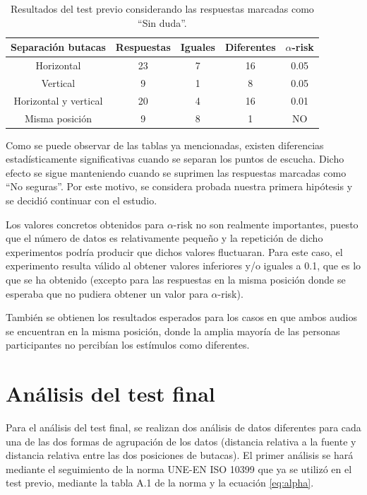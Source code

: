 \documentclass[11pt,a4paper,twoside]{book}
\begin{document}
		\begin{table}
			\begin{center}
			\begin{scriptsize}
			\begin{tabular}{| c | c | c | c || c |}
			    \hline
				\textbf{Separación butacas}&\textbf{Respuestas}&\textbf{Iguales}&\textbf{Diferentes}&\textbf{$\alpha$-risk}\\ \hline
                Horizontal&23&7&16&0.05\\ \hline
                Vertical&9&1&8&0.05\\ \hline
                Horizontal y vertical&20&4&16&0.01\\ \hline
                Misma posición&9&8&1&NO\\ \hline
			\end{tabular}
			\caption{Resultados del test previo considerando las respuestas marcadas como ``Sin duda''.}
			\label{tablaResultadosSinDuda}
			\end{scriptsize}
			\end{center}	
		\end{table}
		
		Como se puede observar de las tablas ya mencionadas, existen diferencias estadísticamente significativas cuando se separan los puntos de escucha. Dicho efecto se sigue manteniendo cuando se suprimen las respuestas marcadas como ``No seguras''. Por este motivo, se considera probada nuestra primera hipótesis y se decidió continuar con el estudio.
		
		Los valores concretos obtenidos para $\alpha$-risk no son realmente importantes, puesto que el número de datos es relativamente pequeño y la repetición de dicho experimentos podría producir que dichos valores fluctuaran. Para este caso, el experimento resulta válido al obtener valores inferiores y/o iguales a 0.1, que es lo que se ha obtenido (excepto para las respuestas en la misma posición donde se esperaba que no pudiera obtener un valor para $\alpha$-risk).
		
		También se obtienen los resultados esperados para los casos en que ambos audios se encuentran en la misma posición, donde la amplia mayoría de las personas participantes no percibían los estímulos como diferentes.
		
    \section{Análisis del test final}
        Para el análisis del test final, se realizan dos análisis de datos diferentes para cada una de las dos formas de agrupación de los datos (distancia relativa a la fuente y distancia relativa entre las dos posiciones de butacas). El primer análisis se hará mediante el seguimiento de la norma UNE-EN ISO 10399 que ya se utilizó en el test previo, mediante la tabla A.1 de la norma y la ecuación \ref{eq:alpha}.
        
\end{document}
